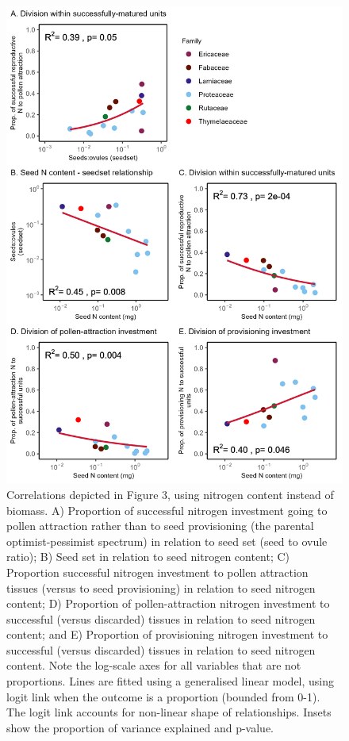\documentclass[10pt,twoside]{article}\usepackage[]{graphicx}\usepackage[]{color}
\begin{document}
\begin{figure}[h]
\centering
\includegraphics[width=12cm]{Figure3N.png}
\caption{Correlations depicted in Figure 3, using nitrogen content instead of biomass. A) Proportion of successful nitrogen investment going to pollen attraction rather than to seed provisioning (the parental optimist-pessimist spectrum) in relation to seed set (seed to ovule ratio); B) Seed set in relation to seed nitrogen content; C) Proportion successful nitrogen investment to pollen attraction tissues (versus to seed provisioning) in relation to seed nitrogen content; D) Proportion of pollen-attraction nitrogen investment to successful (versus discarded) tissues in relation to seed nitrogen content; and E) Proportion of provisioning nitrogen investment to successful (versus discarded) tissues in relation to seed nitrogen content. Note the log-scale axes for all variables that are not proportions. Lines are fitted using a generalised linear model, using logit link when the outcome is a proportion (bounded from 0-1). The logit link accounts for non-linear shape of relationships. Insets show the proportion of variance explained and p-value.}
\end{figure}
\end{document}
